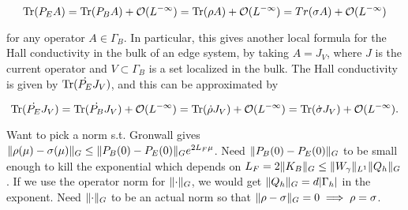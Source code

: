 \documentclass[12pt, letterpaper]{article}
\begin{document}
\[\text{Tr}(P_E A) = \text{Tr}(P_B A) + \mathcal{O}(L^{-\infty}) = \text{Tr}(\rho A) + \mathcal{O}(L^{-\infty}) = Tr(\sigma A) + \mathcal{O}(L^{-\infty}) \]

for any operator $A\in\Gamma_B$. In particular, this gives another local formula for the Hall conductivity in the bulk of an edge system, by taking $A = J_V$, where $J$ is the current operator and $V \subset \Gamma_B$ is a set localized in the bulk. The Hall conductivity is given by $\text{Tr}(\dot{P_E}J_V)$, and this can be approximated by

\[\text{Tr}(\dot{P_E} J_V) = \text{Tr}(\dot{P_B} J_V) + \mathcal{O}(L^{-\infty}) = \text{Tr}(\dot{\rho} J_V) + \mathcal{O}(L^{-\infty}) = \text{Tr}(\dot{\sigma} J_V) + \mathcal{O}(L^{-\infty}).\]

Want to pick a norm s.t. Gronwall gives $\lVert \rho(\mu)-\sigma(\mu) \rVert_G \leq \lVert P_B(0)-P_E(0) \rVert_Ge^{2L_F\mu}$. Need $\lVert P_B(0)-P_E(0) \rVert_G$ to be small enough to kill the exponential which depends on $L_F = 2\lVert K_B \rVert_G \leq \lVert W_\gamma \rVert_{L^1}\lVert Q_h \rVert_G$. If we use the operator norm for $\lVert \cdot \rVert_G$, we would get $\lVert Q_h \rVert_G = d|\Gamma_h|$ in the exponent. Need $\lVert \cdot \rVert_G$ to be an actual norm so that $\lVert \rho-\sigma \rVert_G = 0 \implies \rho = \sigma$.
\end{document}
